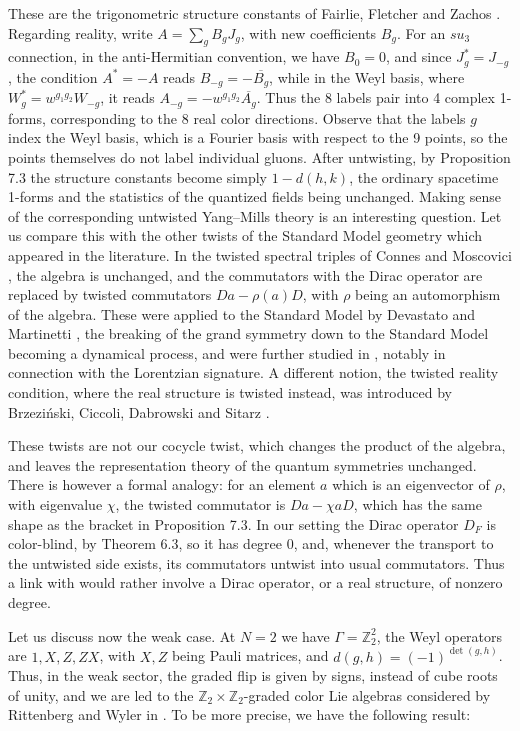 \documentclass[11pt]{amsart}
\theoremstyle{definition}
\begin{document}
These are the trigonometric structure constants of Fairlie, Fletcher and Zachos \cite{ffz}. Regarding reality, write $A=\sum_gB_gJ_g$, with new coefficients $B_g$. For an $su_3$ connection, in the anti-Hermitian convention, we have $B_0=0$, and since $J_g^*=J_{-g}$, the condition $A^*=-A$ reads $B_{-g}=-\overline{B_g}$, while in the Weyl basis, where $W_g^*=w^{g_1g_2}W_{-g}$, it reads $A_{-g}=-w^{g_1g_2}\overline{A_g}$. Thus the 8 labels pair into 4 complex 1-forms, corresponding to the 8 real color directions. Observe that the labels $g$ index the Weyl basis, which is a Fourier basis with respect to the 9 points, so the points themselves do not label individual gluons. After untwisting, by Proposition 7.3 the structure constants become simply $1-d(h,k)$, the ordinary spacetime 1-forms and the statistics of the quantized fields being unchanged. Making sense of the corresponding untwisted Yang--Mills theory is an interesting question.
Let us compare this with the other twists of the Standard Model geometry which appeared in the literature. In the twisted spectral triples of Connes and Moscovici \cite{cmo}, the algebra is unchanged, and the commutators with the Dirac operator are replaced by twisted commutators $Da-\rho(a)D$, with $\rho$ being an automorphism of the algebra. These were applied to the Standard Model by Devastato and Martinetti \cite{dma}, the breaking of the grand symmetry down to the Standard Model becoming a dynamical process, and were further studied in \cite{fma,lma,msi}, notably in connection with the Lorentzian signature. A different notion, the twisted reality condition, where the real structure is twisted instead, was introduced by Brzezi\'nski, Ciccoli, Dabrowski and Sitarz \cite{bcds}.

These twists are not our cocycle twist, which changes the product of the algebra, and leaves the representation theory of the quantum symmetries unchanged. There is however a formal analogy: for an element $a$ which is an eigenvector of $\rho$, with eigenvalue $\chi$, the twisted commutator is $Da-\chi aD$, which has the same shape as the bracket in Proposition 7.3. In our setting the Dirac operator $D_F$ is color-blind, by Theorem 6.3, so it has degree $0$, and, whenever the transport to the untwisted side exists, its commutators untwist into usual commutators. Thus a link with \cite{dma,lma} would rather involve a Dirac operator, or a real structure, of nonzero degree.

Let us discuss now the weak case. At $N=2$ we have $\Gamma=\mathbb Z_2^2$, the Weyl operators are $1,X,Z,ZX$, with $X,Z$ being Pauli matrices, and $d(g,h)=(-1)^{\det(g,h)}$. Thus, in the weak sector, the graded flip is given by signs, instead of cube roots of unity, and we are led to the $\mathbb Z_2\times\mathbb Z_2$-graded color Lie algebras considered by Rittenberg and Wyler in \cite{rw2}. To be more precise, we have the following result:
\end{document}
